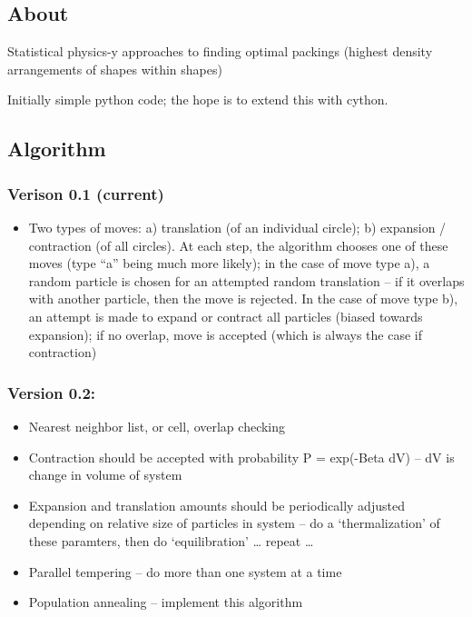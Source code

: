 \documentclass[]{article}
\author{}
\date{}
\begin{document}
\subsection{About}

Statistical physics-y approaches to finding optimal packings (highest
density arrangements of shapes within shapes)

Initially simple python code; the hope is to extend this with cython.

\subsection{Algorithm}

\subsubsection{Verison 0.1 (current)}

\begin{itemize}
\item
  Two types of moves: a) translation (of an individual circle); b)
  expansion / contraction (of all circles). At each step, the algorithm
  chooses one of these moves (type ``a'' being much more likely); in the
  case of move type a), a random particle is chosen for an attempted
  random translation -- if it overlaps with another particle, then the
  move is rejected. In the case of move type b), an attempt is made to
  expand or contract all particles (biased towards expansion); if no
  overlap, move is accepted (which is always the case if contraction)
\end{itemize}

\subsubsection{Version 0.2:}

\begin{itemize}
\item
  Nearest neighbor list, or cell, overlap checking
\item
  Contraction should be accepted with probability P = exp(-Beta dV) --
  dV is change in volume of system
\item
  Expansion and translation amounts should be periodically adjusted
  depending on relative size of particles in system -- do a
  `thermalization' of these paramters, then do `equilibration' \ldots{}
  repeat \ldots{}
\item
  Parallel tempering -- do more than one system at a time
\item
  Population annealing -- implement this algorithm
\end{itemize}
\end{document}
